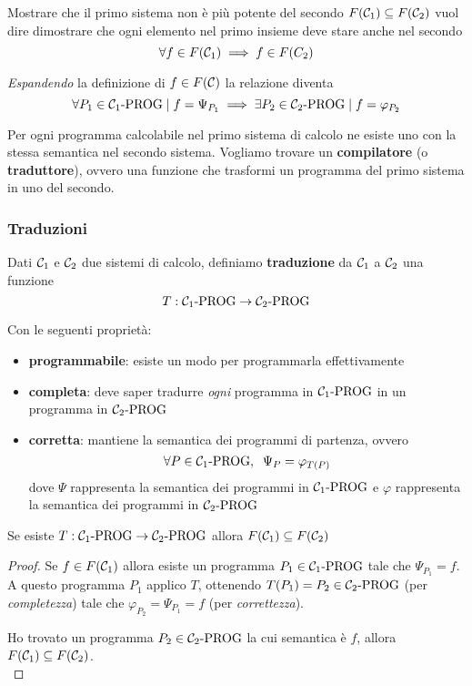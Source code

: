Mostrare che il primo sistema non è più potente del secondo $F(\mathcal{C}_1) \subseteq F(\mathcal{C}_2)$ vuol dire dimostrare che ogni elemento nel primo insieme deve stare anche nel secondo
$$ \forall f \in F(\mathcal{C}_1) \implies f \in F(C_2) $$

\textit{Espandendo} la definizione di $f \in F(\mathcal{C})$ la relazione diventa
$$ \forall P_1 \in \mathcal{C}_{1}\text{-}\text{PROG} \mid f = \Psi_{P_1} \implies \exists P_2 \in \mathcal{C}_{2}\text{-}\text{PROG} \mid f = \varphi_{P_2} $$

Per ogni programma calcolabile nel primo sistema di calcolo ne esiste uno con la stessa semantica nel secondo sistema. Vogliamo trovare un \textbf{compilatore} (o \textbf{traduttore}), ovvero una funzione che trasformi un programma del primo sistema in uno del secondo.

\subsubsection{Traduzioni}
Dati $\mathcal{C}_1$ e $\mathcal{C}_2$ due sistemi di calcolo, definiamo \textbf{traduzione} da $\mathcal{C}_1$ a $\mathcal{C}_2$ una funzione
$$ T: \mathcal{C}_{1}\text{-}\text{PROG} \rightarrow \mathcal{C}_{2}\text{-}\text{PROG} $$

Con le seguenti proprietà:
\begin{itemize}
	\item \textbf{programmabile}: esiste un modo per programmarla effettivamente

	\item \textbf{completa}: deve saper tradurre \textit{ogni} programma in $\mathcal{C}_{1}\text{-}\text{PROG}$ in un programma in $\mathcal{C}_{2}\text{-}\text{PROG}$

	\item \textbf{corretta}: mantiene la semantica dei programmi di partenza, ovvero
	$$ \forall P \in \mathcal{C}_{1}\text{-}\text{PROG}, \;\; \Psi_P = \varphi_{T(P)}$$
	dove $\Psi$ rappresenta la semantica dei programmi in $\mathcal{C}_{1}\text{-}\text{PROG}$ e $\varphi$ rappresenta la semantica dei programmi in $\mathcal{C}_{2}\text{-}\text{PROG}$ \\
\end{itemize}

\begin{theor}
	Se esiste $T: \mathcal{C}_{1}\text{-}\text{PROG} \rightarrow \mathcal{C}_{2}\text{-}\text{PROG}$ allora $F(\mathcal{C}_1) \subseteq F(\mathcal{C}_2)$
\end{theor}
\begin{proof}
	Se $f \in F(\mathcal{C}_1)$ allora esiste un programma $P_1 \in \mathcal{C}_{1}\text{-}\text{PROG}$ tale che $\Psi_{P_1} = f$.
	A questo programma $P_1$ applico $T$, ottenendo $T(P_1) = P_2 \in \mathcal{C}_{2}\text{-}\text{PROG}$ (per \textit{completezza}) tale che $\varphi_{P_2} = \Psi_{P_1} = f$ (per \textit{correttezza}).
	
	Ho trovato un programma $P_2 \in \mathcal{C}_{2}\text{-}\text{PROG}$ la cui semantica è $f$, allora $F(\mathcal{C}_1) \subseteq F(\mathcal{C}_2)$.\\
\end{proof}

